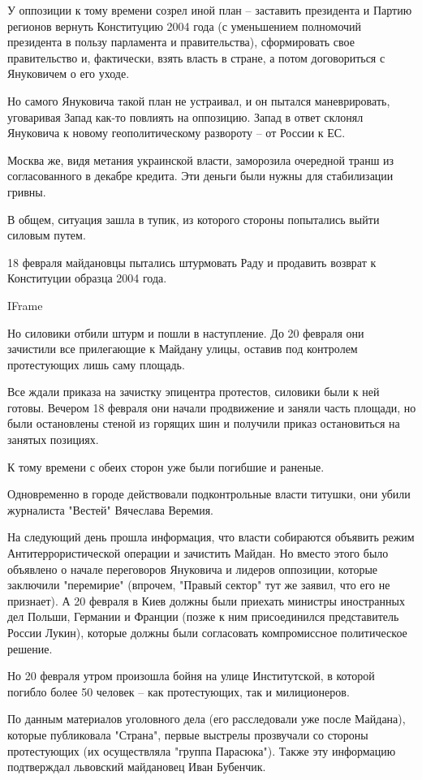 У оппозиции к тому времени созрел иной план – заставить президента и
Партию регионов вернуть Конституцию 2004 года (с уменьшением полномочий
президента в пользу парламента и правительства), сформировать свое
правительство и, фактически, взять власть в стране, а потом договориться с
Януковичем о его уходе. 

Но самого Януковича такой план не устраивал, и он пытался маневрировать,
уговаривая Запад как-то повлиять на оппозицию. Запад в ответ склонял
Януковича к новому геополитическому развороту – от России к ЕС. 

Москва же, видя метания украинской власти, заморозила очередной транш из
согласованного в декабре кредита. Эти деньги были нужны для стабилизации
гривны.

В общем, ситуация зашла в тупик, из которого стороны попытались выйти
силовым путем.

18 февраля майдановцы пытались штурмовать Раду и продавить возврат к
Конституции образца 2004 года.

IFrame

Но силовики отбили штурм и пошли в наступление. До 20 февраля они
зачистили все прилегающие к Майдану улицы, оставив под контролем
протестующих лишь саму площадь.

Все ждали приказа на зачистку эпицентра протестов, силовики были к ней
готовы. Вечером 18 февраля они начали продвижение и заняли часть площади,
но были остановлены стеной из горящих шин и получили приказ остановиться
на занятых позициях.

К тому времени с обеих сторон уже были погибшие и раненые.

Одновременно в городе действовали подконтрольные власти титушки, они убили
журналиста "Вестей" Вячеслава Веремия.

На следующий день прошла информация, что власти собираются объявить режим
Антитеррористической операции и зачистить Майдан. Но вместо этого было
объявлено о начале переговоров Януковича и лидеров оппозиции, которые
заключили "перемирие" (впрочем, "Правый сектор" тут же заявил, что его не
признает). А 20 февраля в Киев должны были приехать министры иностранных
дел Польши, Германии и Франции (позже к ним присоединился представитель
России Лукин), которые должны были согласовать компромиссное политическое
решение.

Но 20 февраля утром произошла бойня на улице Институтской, в которой
погибло более 50 человек – как протестующих, так и милиционеров.

По данным материалов уголовного дела (его расследовали уже после Майдана),
которые публиковала "Страна", первые выстрелы прозвучали со стороны
протестующих (их осуществляла "группа Парасюка"). Также эту информацию
подтверждал львовский майдановец Иван Бубенчик. 

